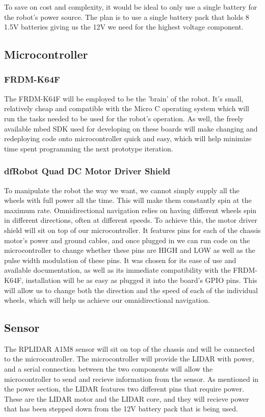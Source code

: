 			To save on cost and complexity, it would be ideal to only use a single battery for the robot's power source. The plan is to use a single battery pack that holds 8 1.5V batteries giving us the 12V we need for the highest voltage component. 
			
		\subsection{Microcontroller}
			\subsubsection{FRDM-K64F}
			The FRDM-K64F will be employed to be the 'brain' of the robot. It's small, relatively cheap and compatible with the Micro C operating system which will run the tasks needed to be used for the robot's operation. As well, the freely available mbed SDK used for developing on these boards will make changing and redeploying code onto microcontroller quick and easy, which will help minimize time spent programming the next prototype iteration.
			
			\subsubsection{dfRobot Quad DC Motor Driver Shield}
			To manipulate the robot the way we want, we cannot simply supply all the wheels with full power all the time. This will make them constantly spin at the maximum rate. Omnidirectional navigation relies on having different wheels spin in different directions, often at different speeds. To achieve this, the motor driver shield will sit on top of our microcontroller. It features pins for each of the chassis motor's power and ground cables, and once plugged in we can run code on the microcontroller to change whether these pins are HIGH and LOW as well as the pulse width modulation of these pins. It was chosen for its ease of use and available documentation, as well as its immediate compatibility with the FRDM-K64F, installation will be as easy as plugged it into the board's GPIO pins. This will allow us to change both the direction and the speed of each of the individual wheels, which will help us achieve our omnidirectional navigation.
		
		\subsection{Sensor}
		The RPLIDAR A1M8 sensor will sit on top of the chassis and will be connected to the microcontroller. The microcontroller will provide the LIDAR with power, and a serial connection between the two components will allow the microcontroller to send and recieve information from the sensor. As mentioned in the power section, the LIDAR features two different pins that require power. These are the LIDAR motor and the LIDAR core, and they will recieve power that has been stepped down from the 12V battery pack that is being used.
	
